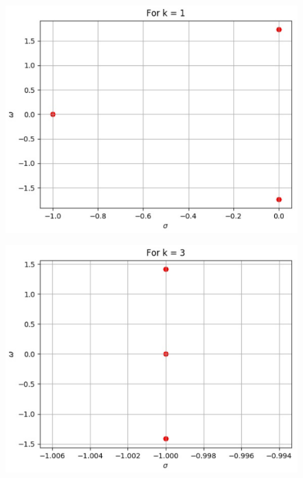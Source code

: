 \begin{figure}[!ht]
\begin{center}
\includegraphics[scale = 0.5]{./figs/ee18btech11039_1.eps}
\end{center}
\label{fig:ee18btech11039}
\end{figure}

\begin{figure}[!ht]
\begin{center}
\includegraphics[scale = 0.5]{./figs/ee18btech11039_2.eps}
\end{center}
\label{fig:ee18btech11039}
\end{figure}

